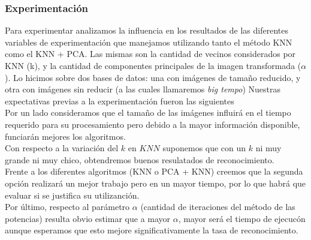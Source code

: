 \subsubsection*{Experimentación}
Para experimentar analizamos la influencia en los resultados de las diferentes variables de experimentación que manejamos utilizando tanto el método KNN como el KNN + PCA. 
Las mismas son la cantidad de vecinos considerados por KNN (k), y la cantidad de componentes principales de la imagen transformada ($\alpha$).
Lo hicimos sobre dos bases de datos: una con im\'agenes de tamaño reducido, y otra con imágenes sin reducir (a las cuales llamaremos \textit{big tempo})
Nuestras expectativas previas a la experimentación fueron las siguientes\\
Por un lado consideramos que el tamaño de las im\'agenes influir\'a en el tiempo requerido para su procesamiento pero debido a la mayor informaci\'on disponible,
funciar\'an mejores los algoritmos.\\
Con respecto a la variaci\'on del $k$ en $KNN$ suponemos que con un $k$ ni muy grande ni muy chico, obtendremos buenos resulatados de reconocimiento.\\
Frente a los diferentes algoritmos (KNN o PCA + KNN) creemos que la segunda opci\'on realizar\'a un mejor trabajo pero en un mayor tiempo, por lo que habr\'a que evaluar si se justifica su utilizanci\'on.\\
Por \'ultimo, respecto al par\'ametro $\alpha$ (cantidad de iteraciones del m\'etodo de las potencias) resulta obvio estimar que a mayor $\alpha$, mayor ser\'a el tiempo de ejecuc\'on aunque esperamos que esto
mejore significativamente la tasa de reconocimiento.
